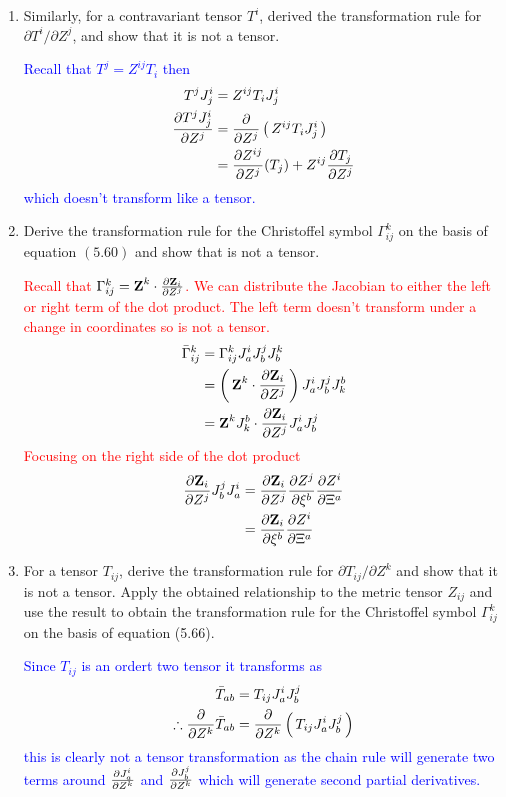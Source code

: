 \documentclass[12pt,a4paper]{report}
\newcommand{\RED}[1]{\textcolor{red}{#1}}
\newcommand{\BLUE}[1]{\textcolor{blue}{#1}}
\newcommand{\COFF}[3]{\Gamma^{#1}_{{#2}{#3}}}
\newcommand{\VK}[1]{\textbf{#1}}
\begin{document}
\begin{enumerate}[label=\textbf{\arabic*.}]
\item Similarly, for a contravariant tensor $T^i$, derived the transformation rule for $\partial T^i/\partial Z^j$, and show that it is not a tensor.

\BLUE{Recall that $T^j = Z^{ij}T_i$ then
\begin{align*}
	T^jJ^i_j &= Z^{ij}T_iJ^i_j \\
	\frac{\partial T^jJ^i_j}{\partial Z^j} &= \frac{\partial }{\partial Z^j}\left (\, Z^{ij}T_iJ^i_j \,\right ) \\
	&= \frac{\partial Z^{ij}}{\partial Z^j}(T_j)+Z^{ij}\frac{\partial T_j}{\partial Z^j}
\end{align*}which doesn't transform like a tensor.
}

\item Derive the transformation rule for the Christoffel symbol $\COFF{k}{i}{j}$ on the basis of equation $(5.60)$ and show that is not a tensor.

\RED{Recall that $\COFF{k}{i}{j} = \VK{Z}^k\cdot\PART{\VK{Z}_i}{Z^j}$.  We can distribute the Jacobian to either the left or right term of the dot product.  The left term doesn't transform under a change in coordinates so is not a tensor.
\begin{align*}
	\bar{\Gamma}^k_{ij} &= \COFF{k}{i}{j}J^i_aJ^j_bJ^k_b \\
	&= \PAREN{\VK{Z}^k\cdot\PART{\VK{Z}_i}{Z^j}}J^i_aJ^j_bJ^b _k \\
	&= \VK{Z}^kJ^b_k\cdot \PART{\VK{Z}_i}{Z^j}J^i_aJ^j_b
\end{align*}Focusing on the right side of the dot product
\begin{align*}
	\PART{\VK{Z}_i}{Z^j}J^j_bJ^i_a &= \PART{\VK{Z}_i}{Z^j}\PART{Z^j}{\xi^b}\PART{Z^i}{\Xi^a} \\
	&= \PART{\VK{Z}_i}{\xi^b}\PART{Z^i}{\Xi^a}
\end{align*}
}

\item For a tensor $T_{ij}$, derive the transformation rule for $\partial T_{ij}/\partial Z^k$ and show that it is not a tensor.  Apply the obtained relationship to the metric tensor $Z_{ij}$ and use the result to obtain the transformation rule for the Christoffel symbol $\COFF{k}{i}{j}$ on the basis of equation (5.66).

\BLUE{Since $T_{ij}$ is an ordert two tensor it transforms as 
\begin{align*}
	\bar{T}_{ab} &= T_{ij}J^i_aJ^j_b \\
	\therefore \frac{\partial }{\partial Z^k}\bar{T}_{ab} &= \frac{\partial }{\partial Z^k}\left (\, T_{ij}J^i_aJ^j_b \,\right )
\end{align*}this is clearly not a tensor transformation as the chain rule will generate two terms around $\frac{\partial J^i_a}{\partial Z^k}$ and $\frac{\partial J^j_b}{\partial Z^k}$ which will generate second partial derivatives.
}


\end{enumerate}
\end{document}
